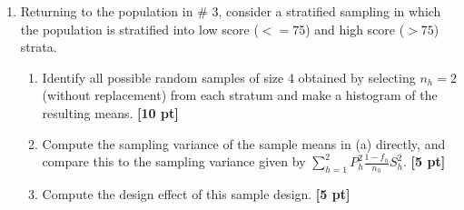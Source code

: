 \documentclass[12pt]{article}
\begin{document}
\begin{enumerate}
\item Returning to the population in \# 3, consider a stratified sampling in which the population is stratified into low score ($<= 75$) and high score ($> 75$) strata.
	\begin{enumerate}
		\item Identify all possible random samples of size 4 obtained by selecting $n_h = 2$ (without replacement) from each stratum and make a histogram of the resulting means. {\bf [10 pt] }
		\item Compute the sampling variance of the sample means in (a) directly, and compare this to the sampling variance given by $\sum_{h=1}^2 P_h^2 \frac{1-f_h}{n_h} S_h^2$. {\bf [5 pt] }
		\item Compute the design effect of this sample design. {\bf [5 pt]}
	\end{enumerate}

\end{enumerate}
\end{document}
